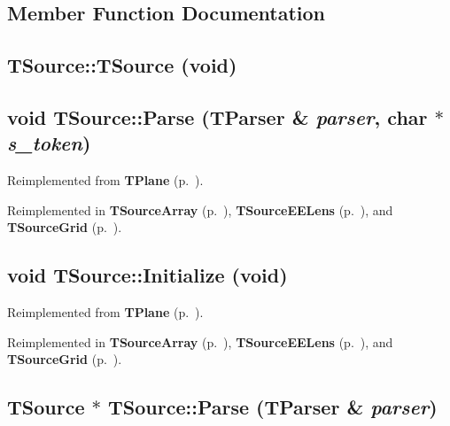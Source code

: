 \subsection*{Member Function Documentation}
\label{TSource_a0}
\subsection{\setlength{\rightskip}{0pt plus 5cm}TSource::TSource (void)}

\label{TSource_a1}
\subsection{\setlength{\rightskip}{0pt plus 5cm}void TSource::Parse ({\bf TParser} \& {\em parser}, char $\ast$ {\em s\_\-token})\hspace{0.3cm}{\tt  [virtual]}}



Reimplemented from {\bf TPlane} {\rm (p.~\pageref{TPlane_a2})}.

Reimplemented in {\bf TSource\-Array} {\rm (p.~\pageref{TSourceArray_a1})}, {\bf TSource\-EELens} {\rm (p.~\pageref{TSourceEELens_a1})}, and {\bf TSource\-Grid} {\rm (p.~\pageref{TSourceGrid_a1})}.\label{TSource_a2}
\subsection{\setlength{\rightskip}{0pt plus 5cm}void TSource::Initialize (void)\hspace{0.3cm}{\tt  [virtual]}}



Reimplemented from {\bf TPlane} {\rm (p.~\pageref{TPlane_a3})}.

Reimplemented in {\bf TSource\-Array} {\rm (p.~\pageref{TSourceArray_a2})}, {\bf TSource\-EELens} {\rm (p.~\pageref{TSourceEELens_a2})}, and {\bf TSource\-Grid} {\rm (p.~\pageref{TSourceGrid_a2})}.\label{TSource_d0}
\subsection{\setlength{\rightskip}{0pt plus 5cm}TSource $\ast$ TSource::Parse ({\bf TParser} \& {\em parser})\hspace{0.3cm}{\tt  [static]}}




